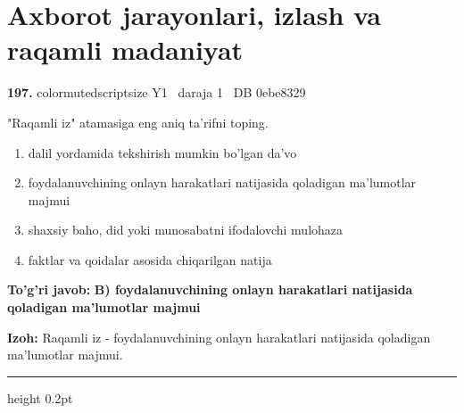 \documentclass[10pt,a4paper,oneside]{article}
\begin{document}
\section{Axborot jarayonlari, izlash va raqamli madaniyat}

\noindent\textbf{\color{ink}197.}  {color{muted}scriptsize Y1 \textbullet\ daraja 1 \textbullet\ DB 0ebe8329}
\par
"Raqamli iz" atamasiga eng aniq ta'rifni toping.
\begin{enumerate}[label=\Alph*),leftmargin=9mm]
\item dalil yordamida tekshirish mumkin bo'lgan da'vo
\item foydalanuvchining onlayn harakatlari natijasida qoladigan ma'lumotlar majmui
\item shaxsiy baho, did yoki munosabatni ifodalovchi mulohaza
\item faktlar va qoidalar asosida chiqarilgan natija
\end{enumerate}
\begin{tcolorbox}[enhanced,breakable,colback=teal!4,colframe=teal!50!black,boxrule=0.5pt,arc=1.1mm,left=3mm,right=3mm,top=1.7mm,bottom=1.7mm,before skip=2mm,after skip=2mm]
\textbf{\color{teal}To'g'ri javob:} \textbf{B) foydalanuvchining onlayn harakatlari natijasida qoladigan ma'lumotlar majmui}
\par\smallskip
\textbf{Izoh:} Raqamli iz - foydalanuvchining onlayn harakatlari natijasida qoladigan ma'lumotlar majmui.
\end{tcolorbox}
\vspace{2mm}\hrule height 0.2pt \vspace{3mm}
\end{document}
